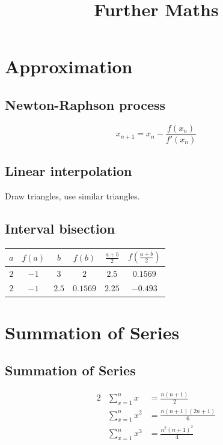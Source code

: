 \documentclass[a4paper,9pt]{scrartcl}
\title{Further Maths}
\begin{document}
    \section{Approximation}

    \subsection{Newton-Raphson process}

    \begin{displaymath}
        x_{n+1} = x_n - \frac{f(x_n)}{f'(x_n)}
    \end{displaymath}

    \subsection{Linear interpolation}

    Draw triangles, use similar triangles.

    \subsection{Interval bisection}

    \begin{tabular}{|c|c|c|c|c|c|}
        \hline $a$ & $f(a)$ & $b$   & $f(b)$   & $\frac{a+b}{2}$ & $f\left(\frac{a+b}{2}\right)$ \\
        \hline $2$ & $-1$   & $3$   & $2$      & $2.5$           & $0.1569$                      \\
        \hline $2$ & $-1$   & $2.5$ & $0.1569$ & $2.25$          & $-0.493$                      \\
        \hline
    \end{tabular}


    \section{Summation of Series}\label{sec:summation-of-series}

    \subsection{Summation of Series}

    \begin{alignat*}{2}
        &\sum_{x=1}^{n}x    &= \frac{n(n+1)}{2} \\
        &\sum_{x=1}^{n}x^2  &= \frac{n(n+1)(2n+1)}{6} \\
        &\sum_{x=1}^{n}x^3  &= \frac{n^2(n+1)^2}{4}
    \end{alignat*}
\end{document}
